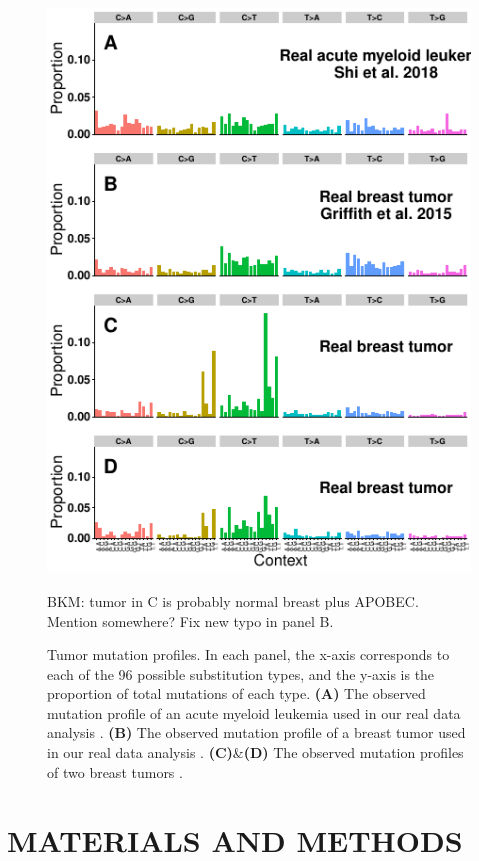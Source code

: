 \documentclass[a4,center,fleqn]{NAR}
\newcommand{\bkmcomment}[1]{{\color{blue}BKM: #1}}
\begin{document}
\begin{figure}
  \begin{center}
  \includegraphics{figures/real_signatures_only.pdf}
  \end{center}
  \bkmcomment{tumor in C is probably normal breast plus APOBEC. Mention somewhere? Fix new typo in panel B.}
  \caption{Tumor mutation profiles.
  In each panel, the x-axis corresponds to each of the 96 possible substitution types, and the y-axis is the proportion of total mutations of each type.
  \textbf{(A)} The observed mutation profile of an acute myeloid leukemia used in our real data analysis \cite{Griffith2015}.
  \textbf{(B)} The observed mutation profile of a breast tumor used in our real data analysis \cite{Shi2018}.
  \textbf{(C)}\&\textbf{(D)} The observed mutation profiles of two breast tumors \cite{Alexandrov2019}.
   }
  \label{NAR-realsigfig}
 \end{figure}

\section{MATERIALS AND METHODS}
\end{document}
